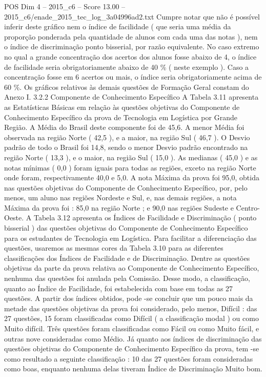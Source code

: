 \begin{textsample}{POS Dim 4 – 2015\_c6 – Score 13.00 – 2015\_c6/enade\_2015\_tec\_log\_3a04996ad2.txt}
Cumpre notar que não é possível inferir deste gráfico nem o índice de facilidade ( que seria uma média da proporção ponderada pela quantidade de alunos com cada uma das notas ), nem o índice de discriminação ponto bisserial, por razão equivalente.
No caso extremo no qual a grande concentração dos acertos dos alunos fosse abaixo de 4, o índice de facilidade seria obrigatoriamente abaixo de 40 \% ( neste exemplo ).
Caso a concentração fosse em 6 acertos ou mais, o índice seria obrigatoriamente acima de 60 \%.
Os gráficos relativos às demais questões de Formação Geral constam do Anexo I. 3.2.2 Componente de Conhecimento Específico A Tabela 3.11 apresenta as Estatísticas Básicas em relação às questões objetivas do Componente de Conhecimento Específico da prova de Tecnologia em Logística por Grande Região.
A Média do Brasil deste componente foi de 45,6.
A menor Média foi observada na região Norte ( 42,5 ), e a maior, na região Sul ( 46,7 ).
O Desvio padrão de todo o Brasil foi 14,8, sendo o menor Desvio padrão encontrado na região Norte ( 13,3 ), e o maior, na região Sul ( 15,0 ).
As medianas ( 45,0 ) e as notas mínimas ( 0,0 ) foram iguais para todas as regiões, exceto na região Norte onde foram, respectivamente 40,0 e 5,0.
A nota Máxima da prova foi 95,0, obtida nas questões objetivas do Componente de Conhecimento Específico, por, pelo menos, um aluno nas regiões Nordeste e Sul, e, nas demais regiões, a nota Máxima da prova foi : 85,0 na região Norte ; e 90,0 nas regiões Sudeste e Centro-Oeste.
A Tabela 3.12 apresenta os Índices de Facilidade e Discriminação ( ponto bisserial ) das questões objetivas do Componente de Conhecimento Específico para os estudantes de Tecnologia em Logística.
Para facilitar a diferenciação das questões, usaremos as mesmas cores da Tabela 3.10 para as diferentes classificações dos Índices de Facilidade e de Discriminação.
Dentre as questões objetivas da parte da prova relativa ao Componente de Conhecimento Específico, nenhuma das questões foi anulada pela Comissão.
Desse modo, a classificação, quanto ao Índice de Facilidade, foi estabelecida com base em todas as 27 questões.
A partir dos índices obtidos, pode -se concluir que um pouco mais da metade das questões objetivas da prova foi considerado, pelo menos, Difícil : das 27 questões, 15 foram classificadas como Difícil ( a classificação modal ) ou como Muito difícil.
Três questões foram classificadas como Fácil ou como Muito fácil, e outras nove consideradas como Médio.
Já quanto aos índices de discriminação das questões objetivas do Componente de Conhecimento Específico da prova, tem -se como resultado a seguinte classificação : 10 das 27 questões foram consideradas como boas, enquanto nenhuma delas tiveram Índice de Discriminação Muito bom.

\end{textsample}
